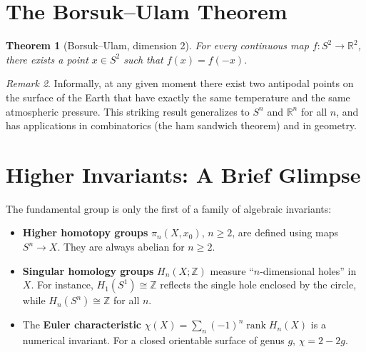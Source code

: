 \documentclass[11pt,a4paper,twoside]{book}
\newtheorem{theorem}{Theorem}[section]
\theoremstyle{remark}
\newtheorem{remark}[theorem]{Remark}
\theoremstyle{definition}
\theoremstyle{definition}
\begin{document}

\section{The Borsuk--Ulam Theorem}
\label{sec:borsuk-ulam}

\begin{theorem}[Borsuk--Ulam, dimension 2]
\label{thm:borsuk-ulam}
For every continuous map $f\colon S^2\to\mathbb{R}^2$, there exists a
point $x\in S^2$ such that $f(x)=f(-x)$.
\end{theorem}

\begin{remark}
\label{rem:borsuk-ulam-interpretation}
Informally, at any given moment there exist two antipodal points on the
surface of the Earth that have exactly the same temperature and the same
atmospheric pressure.  This striking result generalizes to $S^n$ and
$\mathbb{R}^n$ for all $n$, and has applications in combinatorics (the
ham sandwich theorem) and in
geometry.
\end{remark}

\section{Higher Invariants: A Brief Glimpse}
\label{sec:higher-invariants}

The fundamental group is only the first of a family of algebraic
invariants:

\begin{itemize}
  \item \textbf{Higher homotopy groups}
        $\pi_n(X,x_0)$, $n\ge 2$, are defined using maps
        $S^n\to X$.  They are always abelian for $n\ge 2$.
  \item \textbf{Singular homology groups}
        $H_n(X;\mathbb{Z})$ measure ``$n$-dimensional holes'' in $X$.
        For instance, $H_1(S^1)\cong\mathbb{Z}$ reflects the single
        hole enclosed by the circle, while
        $H_n(S^n)\cong\mathbb{Z}$ for all $n$.
  \item The \textbf{Euler characteristic}
        $\chi(X)=\sum_{n}(-1)^n\operatorname{rank}H_n(X)$ is a
        numerical invariant.  For a closed orientable surface of genus
        $g$, $\chi=2-2g$.
\end{itemize}
\end{document}
